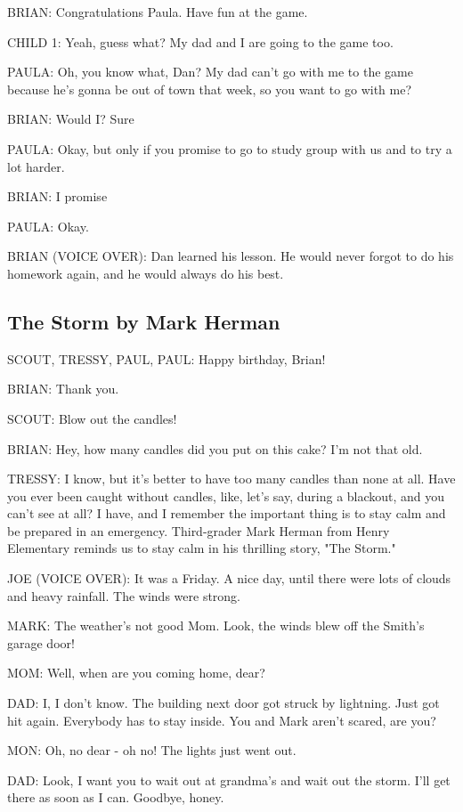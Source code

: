 BRIAN:
Congratulations Paula.
Have fun at the game.

CHILD 1:
Yeah, guess what?
My dad and I are going to the game too.

PAULA:
Oh, you know what, Dan?
My dad can't go with me to the game because he's gonna be out of town that week, so you want to go with me?

BRIAN:
Would I?
Sure

PAULA:
Okay, but only if you promise to go to study group with us and to try a lot harder.

BRIAN:
I promise

PAULA:
Okay.

BRIAN (VOICE OVER):
Dan learned his lesson.
He would never forgot to do his homework again, and he would always do his best.

\subsection{The Storm by Mark Herman}

SCOUT, TRESSY, PAUL, PAUL:
Happy birthday, Brian!

BRIAN:
Thank you.

SCOUT:
Blow out the candles!

BRIAN:
Hey, how many candles did you put on this cake?
I'm not that old.

TRESSY:
I know, but it's better to have too many candles than none at all.
Have you ever been caught without candles, like, let's say, during a blackout, and you can't see at all?
I have, and I remember the important thing is to stay calm and be prepared in an emergency.
Third-grader Mark Herman from Henry Elementary reminds us to stay calm in his thrilling story, "The Storm."

JOE (VOICE OVER):
It was a Friday.
A nice day, until there were lots of clouds and heavy rainfall.
The winds were strong.

MARK:
The weather's not good Mom.
Look, the winds blew off the Smith's garage door!

MOM:
Well, when are you coming home, dear?

DAD:
I, I don't know.
The building next door got struck by lightning.
Just got hit again.
Everybody has to stay inside.
You and Mark aren't scared, are you?

MON:
Oh, no dear - oh no!
The lights just went out.

DAD:
Look, I want you to wait out at grandma's and wait out the storm.
I'll get there as soon as I can.
Goodbye, honey.

